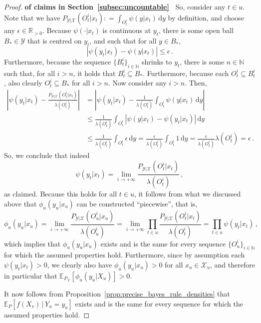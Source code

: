 \documentclass[twoside,11pt]{article}
\newcommand{\nats}{\mathbb{N}}
\newcommand{\reals}{\mathbb{R}}
\newcommand{\realspos}{\reals_{>0}}
\newcommand{\states}{\mathcal{X}}
\newcommand{\observs}{\mathcal{Y}}
\newcommand{\abs}[1]{\left\vert #1 \right\vert}
\newcommand{\coloneqq}{:\!=}
\begin{document}
\begin{proof}{\bf of claims in Section~\ref{subsec:uncountable}~}
So, consider any $t\in u$. Note that we have $P_{\observs\vert\states}(O_t^i\vert x_t)\coloneqq \int_{O_t^i}\psi(y\vert x_t)\,\mathrm{d}y$ by definition, and choose any $\epsilon\in\realspos$. Because $\psi(\cdot\vert x_t)$ is continuous at $y_t$, there is some open ball $B_*\in\observs$ that is centred on $y_t$, and such that for all $y\in B_*$,
\begin{equation*}
\abs{\psi(y_t\vert x_t) - \psi(y\vert x_t)} \leq \epsilon\,.
\end{equation*}
Furthermore, because the sequence $\{B_t^i\}_{i\in\nats}$ shrinks to $y_t$, there is some $n\in\nats$ such that, for all $i>n$, it holds that $B_t^i\subseteq B_*$. Furthermore, because each $O_t^i\subseteq B_t^i$, also clearly $O_t^i\subseteq B_*$ for all $i>n$. Now consider any $i>n$. Then, 
\begin{align*}
\abs{\psi(y_t\vert x_t) - \frac{P_{\observs\vert\states}(O_t^i\vert x_t)}{\lambda(O_t^i)}} &= \abs{\psi(y_t\vert x_t) - \frac{1}{\lambda(O_t^i)}\int_{O_t^i}\psi(y\vert x_t)\,\mathrm{d}y} \\
 &\leq \frac{1}{\lambda(O_t^i)}\int_{O_t^i}\abs{\psi(y\vert x_t) - \psi(y_t\vert x_t)}\,\mathrm{d}y \\
 &\leq \frac{1}{\lambda(O_t^i)}\int_{O_t^i}\epsilon\,\mathrm{d}y
 = \frac{\epsilon}{\lambda(O_t^i)}\int_{O_t^i}1\,\mathrm{d}y 
 = \frac{\epsilon}{\lambda(O_t^i)}\lambda(O_t^i)
 = \epsilon\,.
\end{align*}
So, we conclude that indeed
\begin{equation*}
\psi(y_t\vert x_t) = \lim_{i\to+\infty}\frac{P_{\observs\vert\states}(O_t^i\vert x_t)}{\lambda(O_t^i)}\,,
\end{equation*}
as claimed. Because this holds for all $t\in u$, it follows from what we discussed above that $\phi_u(y_u\vert x_u)$ can be constructed ``piecewise'', that is,
\begin{equation*}
\phi_u(y_u\vert x_u) = \lim_{i\to+\infty}\frac{P_{\observs\vert\states}(O_u^i\vert x_u)}{\lambda(O_u^i)} = \lim_{i\to+\infty}\prod_{t\in u}\frac{P_{\observs\vert\states}(O_t^i\vert x_t)}{\lambda(O_t^i)} = \prod_{t\in u}\psi(y_t\vert x_t)\,,
\end{equation*}
which implies that $\phi_u(y_u\vert x_u)$ exists and is the same for every sequence $\{O_u^i\}_{i\in\nats}$ for which the assumed properties hold. Furthermore, since by assumption each $\psi(y_t\vert x_t)>0$, we clearly also have $\phi_u(y_u\vert x_u)>0$ for all $x_u\in\states_u$, and therefore in particular that $\mathbb{E}_{P_\states}[\phi_u(y_u\vert X_u)]>0$. 

It now follows from Proposition~\ref{prop:precise_bayes_rule_densities} that $\mathbb{E}_P[f(X_v)\,\vert\,Y_u=y_u]$ exists and is the same for every sequence for which the assumed properties hold.
\end{proof}
\end{document}
